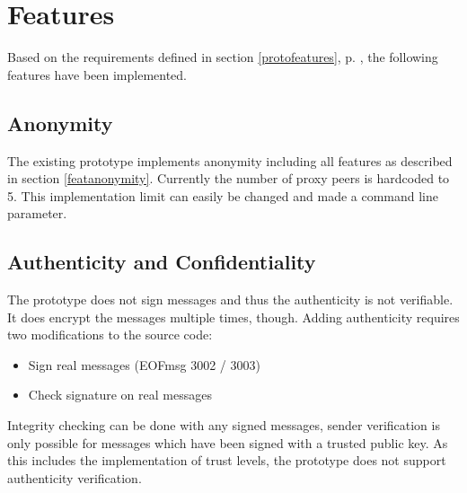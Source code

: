 \section{Features}
Based on the requirements defined in section \ref{protofeatures}, 
p. \pageref{protofeatures}, the following features have been implemented. 
\subsection{Anonymity}
The existing prototype implements anonymity including
all features as described in section \ref{featanonymity}.
Currently the number of proxy peers is hardcoded to 5. This implementation
limit can easily be changed and made a command line parameter.
\subsection{Authenticity and Confidentiality}
The prototype does not sign messages and thus the authenticity is not
verifiable. It does encrypt the messages multiple times, though.
Adding authenticity requires two modifications to the source code:
\begin{itemize}
\item Sign real messages (EOFmsg 3002 / 3003)
\item Check signature on real messages
\end{itemize}
Integrity checking can be done with any signed messages, sender verification
is only possible for messages which have been signed with a
trusted public key. As this includes the implementation of trust levels, the
prototype does not support authenticity verification.
